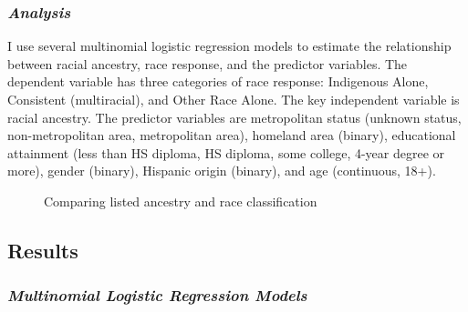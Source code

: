 \documentclass[
  12pt,
  letterpaper,
]{article}
\begin{document}
\subsubsection{\texorpdfstring{\emph{Analysis}}{Analysis}}\label{analysis}

I use several multinomial logistic regression models to estimate the
relationship between racial ancestry, race response, and the predictor
variables. The dependent variable has three categories of race response:
Indigenous Alone, Consistent (multiracial), and Other Race Alone. The
key independent variable is racial ancestry. The predictor variables are
metropolitan status (unknown status, non-metropolitan area, metropolitan
area), homeland area (binary), educational attainment (less than HS
diploma, HS diploma, some college, 4-year degree or more), gender
(binary), Hispanic origin (binary), and age (continuous, 18+).

\begin{figure}[!t]


\caption{\label{fig-race-ancestry}Comparing listed ancestry and race
classification}

\end{figure}%

\subsection{Results}\label{results}

\subsubsection{\texorpdfstring{\emph{Multinomial Logistic Regression
Models}}{Multinomial Logistic Regression Models}}\label{multinomial-logistic-regression-models}
\end{document}

